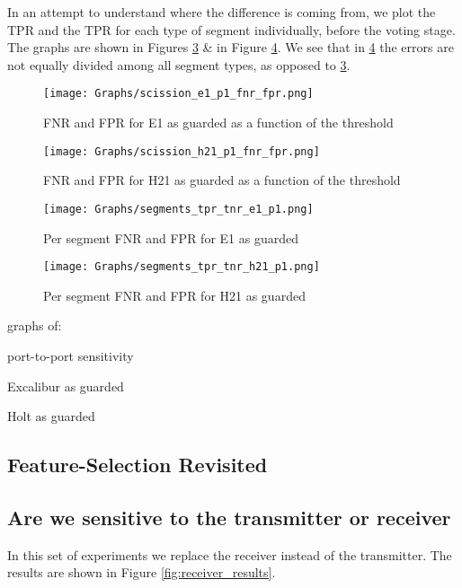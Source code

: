 \documentclass[conference]{IEEEtran}
\begin{document}
  In an attempt to understand where the difference is coming from, we plot the TPR and the TPR for each type of segment individually, before the voting stage. The graphs are shown in Figures \ref{fig:segments_easy_example} \& in Figure \ref{fig:segments_difficult_example}. We see that in \ref{fig:segments_difficult_example} the errors are not equally divided among all segment types, as opposed to \ref{fig:segments_easy_example}.

  \begin{figure}[t]
    \centering
    \texttt{[image: Graphs/scission\_e1\_p1\_fnr\_fpr.png]}
    \caption{FNR and FPR for E1 as guarded as a function of the threshold}
    \label{fig:detection_easy_example}
  \end{figure}
  
  \begin{figure}[t]
    \centering
    \texttt{[image: Graphs/scission\_h21\_p1\_fnr\_fpr.png]}
    \caption{FNR and FPR for H21 as guarded as a function of the threshold}
    \label{fig:detection_difficult_example}
  \end{figure}
  
  \begin{figure}[t]
    \centering
    \texttt{[image: Graphs/segments\_tpr\_tnr\_e1\_p1.png]}
    \caption{Per segment FNR and FPR for E1 as guarded}
    \label{fig:segments_easy_example}
  \end{figure}
  
  \begin{figure}[t]
    \centering
    \texttt{[image: Graphs/segments\_tpr\_tnr\_h21\_p1.png]}
    \caption{Per segment FNR and FPR for H21 as guarded}
    \label{fig:segments_difficult_example}
  \end{figure}
  
  \color{gray}
    graphs of:

    port-to-port sensitivity

    Excalibur as guarded
 
    Holt as guarded
   \color{black}
 
\subsection{Feature-Selection Revisited}

\subsection{Are we sensitive to the transmitter or receiver}
  In this set of experiments we replace the receiver instead of the transmitter. The results are shown in Figure \ref{fig:receiver_results}.
  
\end{document}
